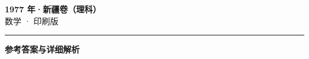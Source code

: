 \documentclass[zihao=5, a4paper]{ctexart}
\begin{document}
\begin{center}
  {\Large\bfseries 1977 年·新疆卷（理科）}\\[4pt]
  {\large 数学 · 印刷版}
\end{center}
\medskip
{}

\par\bigskip\hrule\bigskip
{}
\begin{center}{\large\bfseries 参考答案与详细解析}\end{center}
\smallskip

\end{document}
